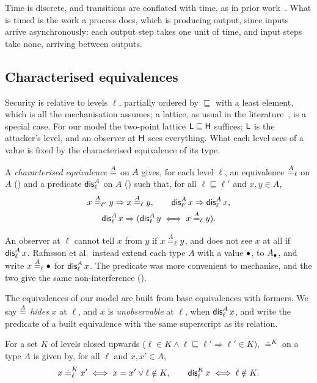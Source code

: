 Time is discrete, and transitions are conflated with time, as in prior
work~\cite{focardi2003,askarov2010,devriese2010,kashyap2011,rafnsson2017}. What is
timed is the work a process does, which is producing output, since inputs arrive
asynchronously: each output step takes one unit of time, and input steps take none,
arriving between outputs.

\subsection{Characterised equivalences}
Security is relative to levels $\ell$, partially ordered by $\sqsubseteq$ with a
least element, which is all the mechanisation assumes; a lattice, as usual in
the literature~\cite{denning1976}, is a special case. For our model the two-point lattice
$\mathsf{L} \sqsubseteq \mathsf{H}$ suffices: $\mathsf{L}$ is the attacker's level, and an observer at
$\mathsf{H}$ sees everything. What each level sees of a value is fixed by the
characterised equivalence of its type.

\begin{definition}\label{def:cequiv}
A \emph{characterised equivalence} $\overset{A}{=}$ on $A$ gives, for each level $\ell$, an
equivalence $\overset{A}{=}_\ell$ on $A$ () and a predicate $\mathsf{dis}^A_\ell$ on
$A$ () such that, for all $\ell \sqsubseteq \ell'$ and $x, y \in A$,
\begin{gather*}
x \overset{A}{=}_{\ell'} y \Rightarrow x \overset{A}{=}_\ell y, \qquad
\mathsf{dis}^A_{\ell'}\,x \Rightarrow \mathsf{dis}^A_\ell\,x, \\
\mathsf{dis}^A_\ell\,x \Rightarrow (\mathsf{dis}^A_\ell\,y \iff x \overset{A}{=}_\ell y).
\end{gather*}
\end{definition}

An observer at $\ell$ cannot tell $x$ from $y$ if $x \overset{A}{=}_\ell y$, and does not
see $x$ at all if $\mathsf{dis}^A_\ell\,x$. Rafnsson et al.\ instead extend each type $A$
with a value $\bullet$, to $A_\bullet$, and write $x \overset{A}{=}_\ell \bullet$ for
$\mathsf{dis}^A_\ell\,x$. The predicate was more convenient to mechanise, and the two give
the same non-interference ().

The equivalences of our model are built from base equivalences with formers. We say
$\overset{A}{=}$ \emph{hides} $x$ at $\ell$, and $x$ is \emph{unobservable} at $\ell$, when
$\mathsf{dis}^A_\ell\,x$, and write the predicate
of a built equivalence with the same superscript as its relation.

\begin{definition}\label{def:base}
For a set $K$ of levels closed upwards ($\ell \in K \wedge \ell \sqsubseteq \ell'
\Rightarrow \ell' \in K$), $\doteq^K$ on a type $A$ is given by, for all $\ell$ and
$x, x' \in A$,
\[
x \doteq^K_\ell x' \iff x = x' \vee \ell \notin K, \qquad
\mathsf{dis}^K_\ell\,x \iff \ell \notin K.
\]
\end{definition}

